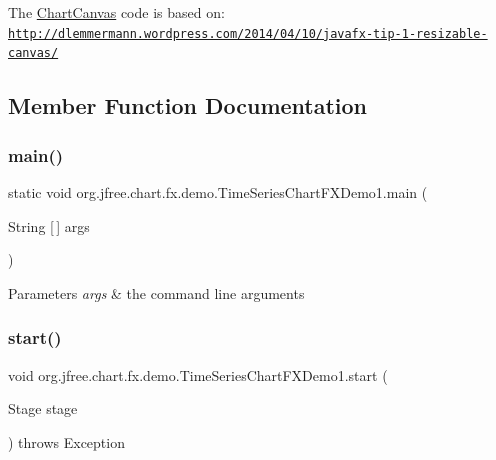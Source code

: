 The \mbox{\hyperlink{classorg_1_1jfree_1_1chart_1_1fx_1_1_chart_canvas}{Chart\+Canvas}} code is based on\+: \href{http://dlemmermann.wordpress.com/2014/04/10/javafx-tip-1-resizable-canvas/}{\tt http\+://dlemmermann.\+wordpress.\+com/2014/04/10/javafx-\/tip-\/1-\/resizable-\/canvas/} 

\subsection{Member Function Documentation}
\mbox{\label{classorg_1_1jfree_1_1chart_1_1fx_1_1demo_1_1_time_series_chart_f_x_demo1_a9025905d8eb4cf676112e36a4c86a4a7}} 
\subsubsection{\texorpdfstring{main()}{main()}}
{\footnotesize\ttfamily static void org.\+jfree.\+chart.\+fx.\+demo.\+Time\+Series\+Chart\+F\+X\+Demo1.\+main (\begin{DoxyParamCaption}\item[{String \mbox{[}$\,$\mbox{]}}]{args }\end{DoxyParamCaption})\hspace{0.3cm}{\ttfamily [static]}}


\begin{DoxyParams}{Parameters}
{\em args} & the command line arguments \\
\hline
\end{DoxyParams}
\mbox{\label{classorg_1_1jfree_1_1chart_1_1fx_1_1demo_1_1_time_series_chart_f_x_demo1_a78372adfd6f8c6bd90ba9ecff8f85da3}} 
\subsubsection{\texorpdfstring{start()}{start()}}
{\footnotesize\ttfamily void org.\+jfree.\+chart.\+fx.\+demo.\+Time\+Series\+Chart\+F\+X\+Demo1.\+start (\begin{DoxyParamCaption}\item[{Stage}]{stage }\end{DoxyParamCaption}) throws Exception}



